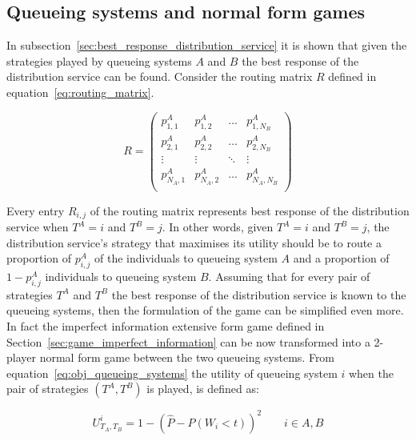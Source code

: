 \subsection{Queueing systems and normal form games}
\label{sec:queueing_systems_and_normal_form_games}

In subsection~\ref{sec:best_response_distribution_service} it is shown that
given the strategies played by queueing systems \(A\) and \(B\) the best
response of the distribution service can be found.
Consider the routing matrix \(R\) defined in equation~\eqref{eq:routing_matrix}.

\begin{equation*}
    R =
    \begin{pmatrix}
        p_{1,1}^A & p_{1,2}^A & \dots & p_{1,N_B}^A \\
        p_{2,1}^A & p_{2,2}^A & \dots & p_{2,N_B}^A \\
        \vdots & \vdots & \ddots & \vdots \\
        p_{N_A,1}^A & p_{N_A,2}^A & \dots & p_{N_A,N_B}^A \\
    \end{pmatrix}
\end{equation*}

Every entry \(R_{i,j}\) of the routing matrix represents best response of
the distribution service when \(T^A=i\) and \(T^B=j\).
In other words, given \(T^A=i\) and \(T^B=j\), the distribution service's
strategy that maximises its utility should be to route a proportion of
\(p^A_{i,j}\) of the individuals to queueing system \(A\) and a proportion of
\(1 - p^A_{i,j}\) individuals to queueing system \(B\).
Assuming that for every pair of strategies \(T^A\) and \(T^B\) the best response
of the distribution service is known to the queueing systems, then the
formulation of the game can be simplified even more.
In fact the imperfect information extensive form game defined in
Section~\ref{sec:game_imperfect_information} can be now transformed into a
2-player normal form game between the two queueing systems.
From equation~\eqref{eq:obj_queueing_systems} the utility of queueing system
\(i\) when the pair of strategies \((T^A, T^B)\) is played, is defined as:

\begin{equation}\label{eq:utility_queueing_systems}
    U_{T_A, T_B}^i = 1 - \left( \hat{P} - P(W_i < t) \right)^2
    \qquad i \in {A, B}
\end{equation}

